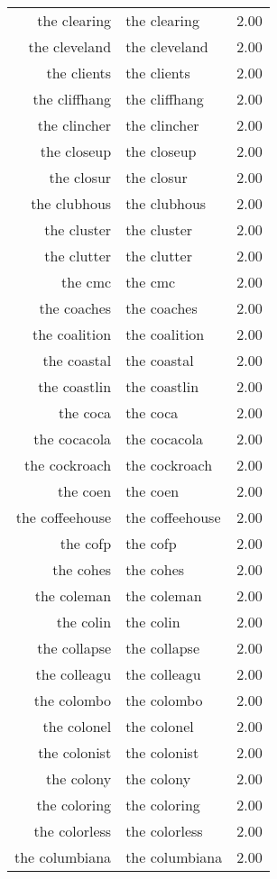 \begin{table}[ht]
\begin{tabular}{rlr}
  the clearing & the clearing & 2.00 \\ 
  the cleveland & the cleveland & 2.00 \\ 
  the clients & the clients & 2.00 \\ 
  the cliffhang & the cliffhang & 2.00 \\ 
  the clincher & the clincher & 2.00 \\ 
  the closeup & the closeup & 2.00 \\ 
  the closur & the closur & 2.00 \\ 
  the clubhous & the clubhous & 2.00 \\ 
  the cluster & the cluster & 2.00 \\ 
  the clutter & the clutter & 2.00 \\ 
  the cmc & the cmc & 2.00 \\ 
  the coaches & the coaches & 2.00 \\ 
  the coalition & the coalition & 2.00 \\ 
  the coastal & the coastal & 2.00 \\ 
  the coastlin & the coastlin & 2.00 \\ 
  the coca & the coca & 2.00 \\ 
  the cocacola & the cocacola & 2.00 \\ 
  the cockroach & the cockroach & 2.00 \\ 
  the coen & the coen & 2.00 \\ 
  the coffeehouse & the coffeehouse & 2.00 \\ 
  the cofp & the cofp & 2.00 \\ 
  the cohes & the cohes & 2.00 \\ 
  the coleman & the coleman & 2.00 \\ 
  the colin & the colin & 2.00 \\ 
  the collapse & the collapse & 2.00 \\ 
  the colleagu & the colleagu & 2.00 \\ 
  the colombo & the colombo & 2.00 \\ 
  the colonel & the colonel & 2.00 \\ 
  the colonist & the colonist & 2.00 \\ 
  the colony & the colony & 2.00 \\ 
  the coloring & the coloring & 2.00 \\ 
  the colorless & the colorless & 2.00 \\ 
  the columbiana & the columbiana & 2.00 \\ 

\end{tabular}
\end{table}
